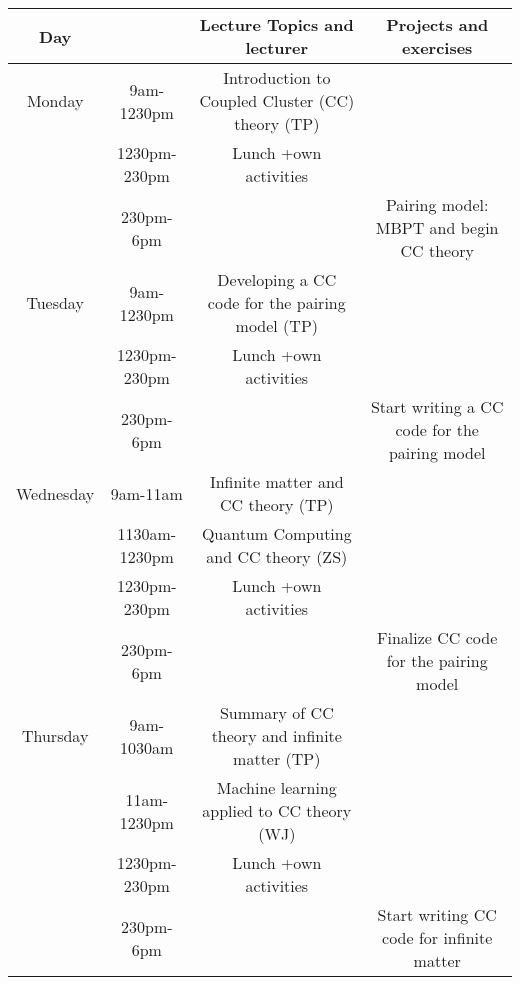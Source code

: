 \documentclass{beamer}
\begin{document}
\begin{frame}
\begin{block}{}
{\footnotesize
\begin{tabular}{cccc}
\hline
\multicolumn{1}{c}{ Day } & \multicolumn{1}{c}{  } & \multicolumn{1}{c}{ Lecture Topics and lecturer } & \multicolumn{1}{c}{ Projects and exercises } \\
\hline
Monday    & 9am-1230pm    & Introduction to Coupled Cluster (CC) theory (TP)  &                                               \\
          & 1230pm-230pm  & Lunch +own activities                             &                                               \\
          & 230pm-6pm     &                                                   & Pairing model: MBPT and begin CC theory       \\
\hline
Tuesday   & 9am-1230pm    & Developing a CC code for the pairing model (TP)   &                                               \\
          & 1230pm-230pm  & Lunch +own activities                             &                                               \\
          & 230pm-6pm     &                                                   & Start writing a CC code for the pairing model \\
\hline
Wednesday & 9am-11am      & Infinite matter and CC theory (TP)                &                                               \\
          & 1130am-1230pm & Quantum Computing and CC theory (ZS)              &                                               \\
          & 1230pm-230pm  & Lunch +own activities                             &                                               \\
          & 230pm-6pm     &                                                   & Finalize CC code for the pairing model        \\
\hline
Thursday  & 9am-1030am    & Summary of CC theory and infinite matter (TP)     &                                               \\
          & 11am-1230pm   & Machine learning applied to CC theory (WJ)        &                                               \\
          & 1230pm-230pm  & Lunch +own activities                             &                                               \\
          & 230pm-6pm     &                                                   & Start writing CC code for infinite matter     \\

\end{tabular}}
\end{block}
\end{frame}
\end{document}
